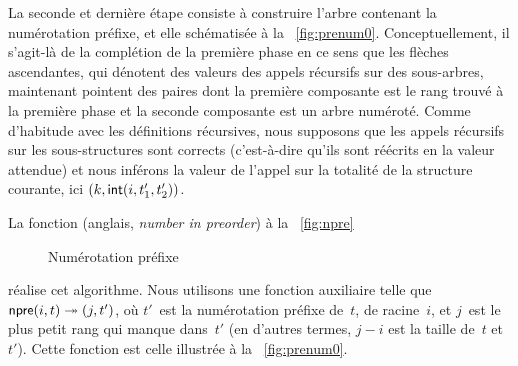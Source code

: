 La seconde et dernière étape consiste à construire l'arbre contenant
la numérotation préfixe, et elle schématisée à la
\fig~\vref{fig:prenum0}. Conceptuellement, il s'agit-là de la
complétion de la première phase en ce sens que les flèches
ascendantes, qui dénotent des valeurs des appels récursifs sur des
sous-arbres, maintenant pointent des paires dont la première
composante est le rang trouvé à la première phase et la seconde
composante est un arbre numéroté. Comme d'habitude avec les
définitions récursives, nous supposons que les appels récursifs sur
les sous-structures sont corrects (c'est-à-dire qu'ils sont réécrits
en la valeur attendue) et nous inférons la valeur de l'appel sur la
totalité de la structure courante, ici
\(({k},{\textsf{int}(i,t'_1,t'_2)})\).

La fonction  (anglais,
\emph{number in preorder}) à la \fig~\vref{fig:npre}
\begin{figure}[t]
\abovedisplayskip=0pt
\belowdisplayskip=0pt
\centering
{}
\caption{Numérotation préfixe}
\label{fig:npre}
\end{figure}
réalise cet algorithme. Nous utilisons une fonction auxiliaire
 telle que \(\textsf{npre}(i,t)
\twoheadrightarrow ({j},{t'})\), où \(t'\)~est la numérotation
préfixe de~\(t\), de racine~\(i\), et \(j\)~est le plus petit rang qui
manque dans~\(t'\) (en d'autres termes, \(j-i\) est la taille de~\(t\)
et~\(t'\)). Cette fonction est celle illustrée à la
\fig~\vref{fig:prenum0}.

